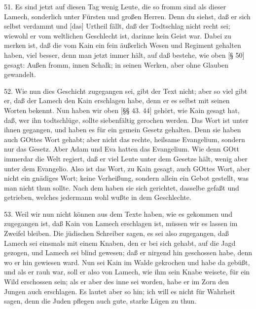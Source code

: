 51. Es sind jetzt auf diesen Tag wenig Leute, die so fromm sind als dieser Lamech, sonderlich unter Fürsten und großen Herren. Denn du siehst, daß er sich selbst verdammt und [das] Urtheil fällt, daß der Todtschlag nicht recht sei; wiewohl er vom weltlichen Geschlecht ist, darinne kein Geist war. Dabei zu merken ist, daß die vom Kain ein fein äußerlich Wesen und Regiment gehalten haben, viel besser, denn man jetzt immer hält, auf daß bestehe, wie oben [§ 50] gesagt: Außen fromm, innen Schalk; in seinen Werken, aber ohne Glauben gewandelt.

52. Wie nun dies Geschicht zugegangen sei, gibt der Text nicht; aber so viel gibt er, daß der Lamech den Kain erschlagen habe, denn er es selbst mit seinen Worten bekennt. Nun haben wir oben [§§ 43. 44] gehört, wie Kain gesagt hat, daß, wer ihn todtschlüge, sollte siebenfältig gerochen werden. Das Wort ist unter ihnen gegangen, und haben es für ein gemein Gesetz gehalten. Denn sie haben auch GOttes Wort gehabt; aber nicht das rechte, heilsame Evangelium, sondern nur das Gesetz. Aber Adam und Eva hatten das Evangelium. Wie denn GOtt immerdar die Welt regiert, daß er viel Leute unter dem Gesetze hält, wenig aber unter dem Evangelio. Also ist das Wort, zu Kain gesagt, auch GOttes Wort, aber nicht ein gnädiges Wort; keine Verheißung, sondern allein ein Gebot gestellt, was man nicht thun sollte. Nach dem haben sie sich gerichtet, dasselbe gefaßt und getrieben, welches jedermann wohl wußte in dem Geschlechte.

53. Weil wir nun nicht können aus dem Texte haben, wie es gekommen und zugegangen ist, daß Kain von Lamech erschlagen ist, müssen wir es lassen im Zweifel bleiben. Die jüdischen Schreiber sagen, es sei also zugegangen, daß Lamech sei einsmals mit einem Knaben, den er bei sich gehabt, auf die Jagd gezogen, und Lamech
sei blind gewesen; daß er nirgend hin geschossen habe, denn wo er hin gewiesen ward. Nun sei Kain im Walde gekrochen und habe da gebüßt, und als er rauh war, soll er also von Lamech, wie ihm sein Knabe weisete, für ein Wild erschossen sein; als er aber des inne sei worden, habe er im Zorn den Jungen auch erschlagen. Es lautet aber so hin; ich will es nicht für Wahrheit sagen, denn die Juden pflegen auch gute, starke Lügen zu thun.

